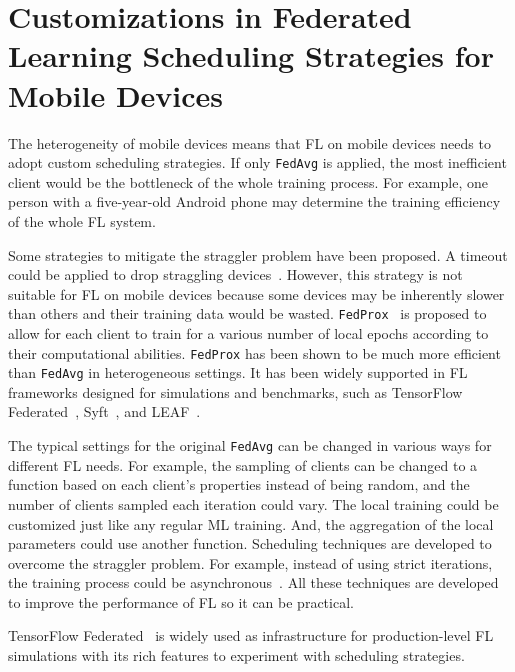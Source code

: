 \documentclass[conference]{IEEEtran}
\begin{document}
\section{Customizations in Federated Learning Scheduling Strategies for
    Mobile Devices
}

The heterogeneity of mobile devices means that FL on mobile devices needs to
adopt custom scheduling strategies.
If only \verb|FedAvg| is applied,
the most inefficient client would be the bottleneck of
the whole training process.
For example, one person with a five-year-old Android phone may determine
the training efficiency of the whole FL system.

Some strategies to mitigate the straggler problem have been proposed.
A timeout could be applied to drop
straggling devices~\cite{bonawitz2019towards}.
However, this strategy is not suitable for FL on mobile devices because
some devices may be inherently slower than others and
their training data would be wasted.
\verb|FedProx|~\cite{li2020federated} is proposed to
allow for each client to train for a various number of local epochs according to
their computational abilities.
\verb|FedProx| has been shown to be much more efficient than
\verb|FedAvg| in heterogeneous settings.
It has been widely supported in FL frameworks designed for simulations and
benchmarks, such as
TensorFlow Federated~\cite{tff},
Syft~\cite{ryffel2018generic,Ziller2021,hall2021syft}, and
LEAF~\cite{caldas2018leaf}.

The typical settings for the original \verb|FedAvg| can be changed in
various ways for different FL needs.
For example,
the sampling of clients can be changed to a function based on
each client's properties instead of being random,
and the number of clients sampled each iteration could vary.
The local training could be customized just like any regular ML training.
And, the aggregation of the local parameters could use another function.
Scheduling techniques are developed to overcome the straggler problem.
For example, instead of using strict iterations,
the training process could be
asynchronous~\cite{chilimbi2014project,zhu2022online}.
All these techniques are developed to improve the performance of FL
so it can be practical.

TensorFlow Federated~\cite{tff} is widely used as
infrastructure for production-level FL simulations with
its rich features to experiment with scheduling strategies.
\end{document}
